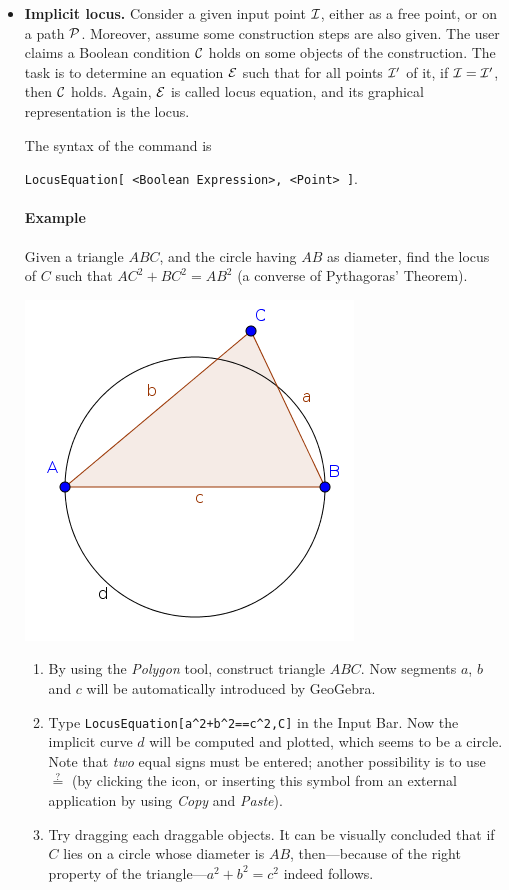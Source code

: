\documentclass{article}
\begin{document}
\begin{itemize}
\item \textbf{Implicit locus.}
Consider a given input point $\cal I$, either as a free point, or on a path $\cal P$. Moreover, assume some construction steps are also given. The user claims a Boolean condition $\cal C$  holds on some objects of the construction. The task is to determine an equation $\cal E$ such that for all points $\cal{I}'$ of it, if $\cal{I}=\cal{I}'$, then $\cal{C}$ holds. Again, $\cal{E}$ is called locus equation, and its graphical representation is the locus.

The syntax of the command is
\begin{center}
    \texttt{LocusEquation[ <Boolean Expression>, <Point> ]}.
\end{center}


\paragraph{Example}
Given a triangle $ABC$, and the circle having $AB$ as diameter, find the locus of $C$ such that $AC^2+BC^2=AB^2$ (a converse of Pythagoras' Theorem).
\begin{center}
\includegraphics[scale=0.5]{LocusEquation-example-implicit}
\end{center}
\begin{enumerate}
    \item By using the \textit{Polygon} tool, construct triangle $ABC$. Now segments $a$, $b$ and $c$ will be automatically introduced by GeoGebra.
    \item Type \texttt{LocusEquation[a\^{}2+b\^{}2==c\^{}2,C]} in the Input Bar. Now the implicit curve $d$ will be computed and plotted, which seems to be a circle.
    Note that \textit{two} equal signs must be entered; another possibility is to use $\stackrel{?}{=}$ (by clicking the \framebox{$\alpha$} icon, or inserting this symbol from an external application by using \textit{Copy} and \textit{Paste}).
    \item Try dragging each draggable objects. It can be visually concluded that if $C$ lies on a circle whose diameter is $AB$, then---because of the right property of the triangle---$a^2+b^2=c^2$ indeed follows.
\end{enumerate}
\end{itemize}
\end{document}

